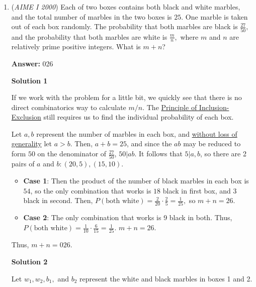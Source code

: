 \begin{enumerate}
	\item (\textit{AIME I 2000}) Each of two boxes contains both black and white marbles, and the total number of marbles in the two boxes is $25.$ One marble is taken out of each box randomly. The probability that both marbles are black is $\frac{27}{50},$ and the probability that both marbles are white is $\frac{m}{n},$ where $m$ and $n$ are relatively prime positive integers. What is $m + n$?


 
 \textbf{Answer: }026



\textbf{Solution 1}

If we work with the problem for a little bit, we quickly see that there is no direct combinatorics way to calculate $m/n$. The \href{https://artofproblemsolving.com/wiki/index.php?title=Principle\_of\_Inclusion-Exclusion}{Principle of Inclusion-Exclusion} still requires us to find the individual probability of each box.

 Let $a, b$ represent the number of marbles in each box, and \href{https://artofproblemsolving.com/wiki/index.php?title=Without\_loss\_of\_generality}{without loss of generality} let $a>b$. Then, $a + b = 25$, and since the $ab$ may be reduced to form $50$ on the denominator of $\frac{27}{50}$, $50|ab$. It follows that $5|a,b$, so there are 2 pairs of $a$ and $b: (20,5),(15,10)$.

 
            \begin{itemize}
        \item \textbf{Case 1}: Then the product of the number of black marbles in each box is $54$, so the only combination that works is $18$ black in first box, and $3$ black in second. Then, $P(\text{both white}) = \frac{2}{20} \cdot \frac{2}{5} = \frac{1}{25},$ so $m + n = 26$.
            \end{itemize}
            
            \begin{itemize}
        \item \textbf{Case 2}: The only combination that works is 9 black in both. Thus, $P(\text{both white}) = \frac{1}{10}\cdot \frac{6}{15} = \frac{1}{25}$. $m + n = 26$.
            \end{itemize}
            Thus, $m + n = \boxed{026}$.

 



\textbf{Solution 2}

Let $w_1, w_2, b_1,$ and $b_2$ represent the white and black marbles in boxes 1 and 2.


\end{enumerate}
